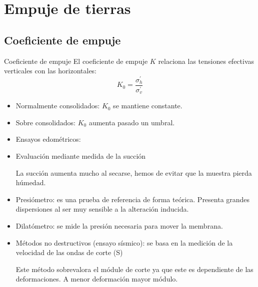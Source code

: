 \section{Empuje de tierras} %
\label{sec:empuje_de_tierras}

\subsection{Coeficiente de empuje} %
\label{sub:coeficiente_de_empuje}
\begin{mybox}{Coeficiente de empuje}
	El coeficiente de empuje $K$ relaciona las tensiones efectivas verticales con las horizontales:
	\[
		K_0 = \frac{\sigma_h^\prime}{\sigma_v^\prime}
	\]	
	\begin{itemize}
		\item Normalmente consolidados: $K_0$ se mantiene constante.
		\item Sobre consolidados: $K_0$ aumenta pasado un umbral.
	\end{itemize}


	\begin{itemize}
		\item Ensayos edométricos:
		\item Evaluación mediante medida de la succión
		\begin{myrem}[Húmedad]
			La succión aumenta mucho al secarse, hemos de evitar que la muestra pierda húmedad.
		\end{myrem}
	\end{itemize}
	

	\begin{itemize}
		\item Presiómetro: es una prueba de referencia de forma teórica. Presenta grandes dispersiones al ser muy sensible a la alteración inducida.
		\item Dilatómetro: se mide la presión necesaria para mover la membrana.
		\item Métodos no destructivos (ensayo sísmico): se basa en la medición de la velocidad de las ondas de corte (S)
		\begin{myrem}[Deformaciones]
			Este método sobrevalora el módule de corte ya que este es dependiente de las deformaciones. A menor deformación mayor módulo.
		\end{myrem}
	\end{itemize}
\end{mybox}

